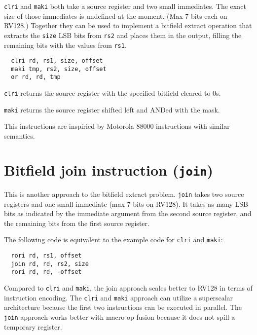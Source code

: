 {\tt clri} and {\tt maki} both take a source register and two small immediates.
The exact size of those immediates is undefined at the moment. (Max 7 bits each
on RV128.) Together they can be used to implement a bitfield extract operation
that extracts the {\tt size} LSB bits from {\tt rs2} and places them in the
output, filling the remaining bits with the values from {\tt rs1}.

\begin{verbatim}
  clri rd, rs1, size, offset
  maki tmp, rs2, size, offset
  or rd, rd, tmp
\end{verbatim}

{\tt clri} returns the source register with the specified bitfield cleared to 0s.

{\tt maki} returns the source register shifted left and ANDed with the mask.



This instructions are inspiried by Motorola 88000 instructions with similar semantics.


\section{Bitfield join instruction (\texttt{join})}

This is another approach to the bitfield extract problem. {\tt join} takes two
source registers and one small immediate (max 7 bits on RV128). It takes as many
LSB bits as indicated by the immediate argument from the second source register,
and the remaining bits from the first source register.

The following code is equivalent to the example code for {\tt clri} and {\tt maki}:

\begin{verbatim}
  rori rd, rs1, offset
  join rd, rd, rs2, size
  rori rd, rd, -offset
\end{verbatim}



Compared to {\tt clri} and {\tt maki}, the join approach scales better to RV128
in terms of instruction encoding. The {\tt clri} and {\tt maki} approach can
utilize a superscalar architecture because the first two instructions can be
executed in parallel. The {\tt join} approach works better with
macro-op-fusion because it does not spill a temporary register.

